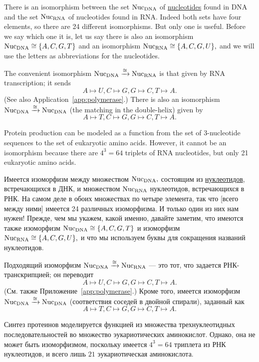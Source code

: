 \documentclass[../main/CT4S-EN-RU]{subfiles}
\begin{document}
\begin{applicationENG}\label{app:DNA RNA}
There is an isomorphism between the set $\textnormal{Nuc}_\textnormal{DNA}$ of \href{http://en.wikipedia.org/wiki/Nucleotides}{\text nucleotides} found in DNA and the set $\textnormal{Nuc}_\textnormal{RNA}$ of nucleotides found in RNA. Indeed both sets have four elements, so there are 24 different isomorphisms. But only one is useful. Before we say which one it is, let us say there is also an isomorphism $\textnormal{Nuc}_\textnormal{DNA}\cong\{A,C,G,T\}$ and an isomorphism $\textnormal{Nuc}_\textnormal{RNA}\cong\{A,C,G,U\},$ and we will use the letters as abbreviations for the nucleotides. 

The convenient isomorphism $\textnormal{Nuc}_\textnormal{DNA}\xrightarrow{\cong}\textnormal{Nuc}_\textnormal{RNA}$ is that given by RNA transcription; it sends 
$$A\mapsto U, C\mapsto G, G\mapsto C, T\mapsto A.$$ 
(See also Application~\ref{app:polymerase}.) There is also an isomorphism $\textnormal{Nuc}_\textnormal{DNA}\xrightarrow{\cong}\textnormal{Nuc}_\textnormal{DNA}$ (the matching in the double-helix) given by 
$$A\mapsto T, C\mapsto G, G\mapsto C, T\mapsto A.$$

Protein production can be modeled as a function from the set of 3-nucleotide sequences to the set of eukaryotic amino acids. However, it cannot be an isomorphism because there are $4^3=64$ triplets of RNA nucleotides, but only 21 eukaryotic amino acids. 
\end{applicationENG}

\begin{applicationRUS}\label{app:DNA RNA}
Имеется изоморфизм между множеством $\textnormal{Nuc}_\textnormal{DNA},$ состоящим из  \href{https://ru.wikipedia.org/wiki/%D0%9D%D1%83%D0%BA%D0%BB%D0%B5%D0%BE%D1%82%D0%B8%D0%B4%D1%8B}{\text нуклеотидов}, встречающихся в ДНК, и множеством $\textnormal{Nuc}_\textnormal{RNA}$ нуклеотидов, встречающихся в РНК. На самом деле в обоих множествах по четыре элемента, так что [всего между ними] имеется 24 различных изоморфизма. И только один из них нам нужен! Прежде, чем мы укажем, какой именно, давайте заметим, что имеются также изоморфизм $\textnormal{Nuc}_\textnormal{DNA}\cong\{A,C,G,T\}$ и изоморфизм $\textnormal{Nuc}_\textnormal{RNA}\cong\{A,C,G,U\},$ и что мы используем буквы для сокращения названий нуклеотидов. 

Подходящий изоморфизм $\textnormal{Nuc}_\textnormal{DNA}\xrightarrow{\cong}\textnormal{Nuc}_\textnormal{RNA}$ — это тот, что задается РНК-транскрипцией; он переводит
$$A\mapsto U, C\mapsto G, G\mapsto C, T\mapsto A.$$ 
(См. также Приложение~\ref{app:polymerase}.) Кроме того, имеется изоморфизм $\textnormal{Nuc}_\textnormal{DNA}\xrightarrow{\cong}\textnormal{Nuc}_\textnormal{DNA}$ (соответствия соседей в двойной спирали), заданный как  
$$A\mapsto T, C\mapsto G, G\mapsto C, T\mapsto A.$$

Синтез протеинов моделируется функцией из множества трехнуклеотидных последовательностей во множество эукариотических аминокислот. Однако, она не может быть изоморфизмом, поскольку имеется $4^3=64$ триплета из РНК нуклеотидов, и всего лишь $21$ эукариотическая аминокислота. 
\end{applicationRUS}
\end{document}
